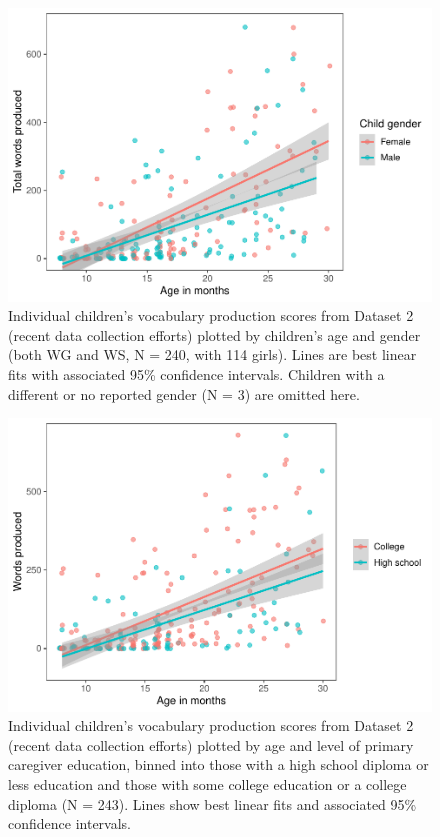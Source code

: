 \documentclass[
  english,
  ,man,floatsintext]{apa6}
\begin{document}
\begin{figure}
\centering
\includegraphics{webcdi_paper_files/figure-latex/genderses-1.pdf}
\caption{\label{fig:genderses}Individual children's vocabulary production scores from Dataset 2 (recent data collection efforts) plotted by children's age and gender (both WG and WS, N = 240, with 114 girls). Lines are best linear fits with associated 95\% confidence intervals. Children with a different or no reported gender (N = 3) are omitted here.}
\end{figure}

\begin{figure}
\centering
\includegraphics{webcdi_paper_files/figure-latex/momedses-1.pdf}
\caption{\label{fig:momedses}Individual children's vocabulary production scores from Dataset 2 (recent data collection efforts) plotted by age and level of primary caregiver education, binned into those with a high school diploma or less education and those with some college education or a college diploma (N = 243). Lines show best linear fits and associated 95\% confidence intervals.}
\end{figure}
\end{document}
